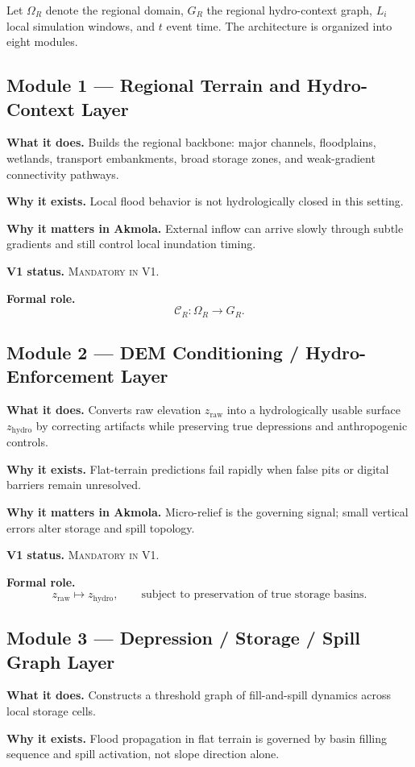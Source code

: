\documentclass[11pt]{article}
\newcommand{\vone}{\textsc{Mandatory in V1}}
\begin{document}
Let $\Omega_R$ denote the regional domain, $G_R$ the regional hydro-context graph, $L_i$ local simulation windows, and $t$ event time. The architecture is organized into eight modules.

\subsection{Module 1 --- Regional Terrain and Hydro-Context Layer}
\textbf{What it does.} Builds the regional backbone: major channels, floodplains, wetlands, transport embankments, broad storage zones, and weak-gradient connectivity pathways.

\textbf{Why it exists.} Local flood behavior is not hydrologically closed in this setting.

\textbf{Why it matters in Akmola.} External inflow can arrive slowly through subtle gradients and still control local inundation timing.

\textbf{V1 status.} \vone.

\textbf{Formal role.}
\[
\mathcal{C}_R:\Omega_R \rightarrow G_R.
\]

\subsection{Module 2 --- DEM Conditioning / Hydro-Enforcement Layer}
\textbf{What it does.} Converts raw elevation $z_{\mathrm{raw}}$ into a hydrologically usable surface $z_{\mathrm{hydro}}$ by correcting artifacts while preserving true depressions and anthropogenic controls.

\textbf{Why it exists.} Flat-terrain predictions fail rapidly when false pits or digital barriers remain unresolved.

\textbf{Why it matters in Akmola.} Micro-relief is the governing signal; small vertical errors alter storage and spill topology.

\textbf{V1 status.} \vone.

\textbf{Formal role.}
\[
z_{\mathrm{raw}} \mapsto z_{\mathrm{hydro}}, \qquad
\text{subject to preservation of true storage basins.}
\]

\subsection{Module 3 --- Depression / Storage / Spill Graph Layer}
\textbf{What it does.} Constructs a threshold graph of fill-and-spill dynamics across local storage cells.

\textbf{Why it exists.} Flood propagation in flat terrain is governed by basin filling sequence and spill activation, not slope direction alone.
\end{document}
